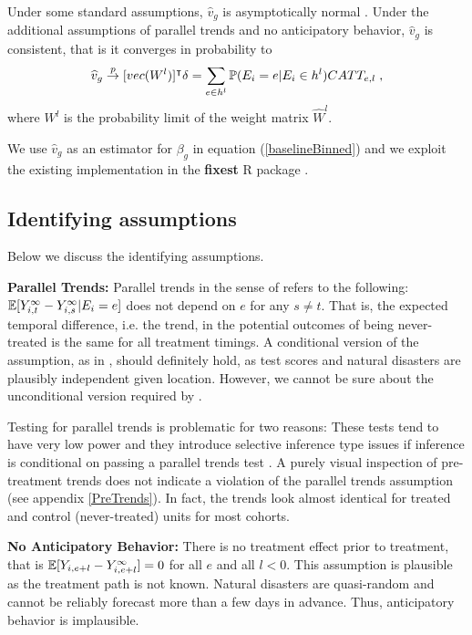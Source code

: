 Under some standard assumptions, $\widehat{v}_g$ is asymptotically normal \citep[for a proof and a detailed description of said assumptions see][Appendix C]{Sun_2021}. Under the additional assumptions of parallel trends and no anticipatory behavior, $\widehat{v}_g$ is consistent, that is it converges in probability to
\begin{align*}
	\widehat{v}_g \overset{p}{\to} [vec(W^{l})]^\intercal \delta = \sum_{e \in h^{l}} \mathbb{P}(E_i = e | E_i \in h^{l}) CATT_{e, l} \; ,
\end{align*}
where $W^{l}$ is the probability limit of the weight matrix $\widehat{W}^l$.

We use $\widehat{v}_g$ as an estimator for $\beta_{g}$ in equation (\ref{baselineBinned}) and we exploit the existing implementation in the \textbf{fixest} R package \citep{Berge_2018}.

\subsection{Identifying assumptions}

Below we discuss the identifying assumptions.

\textbf{Parallel Trends:} Parallel trends in the sense of \cite{Sun_2021} refers to the following: $\mathbb{E}[Y_{i, t}^{\infty} - Y_{i, s}^{\infty} | E_i = e]$ does not depend on $e$ for any $s \neq t$. That is, the expected temporal difference, i.e. the trend, in the potential outcomes of being never-treated is the same for all treatment timings. A conditional version of the assumption, as in \cite{Callaway_2021}, should definitely hold, as test scores and natural disasters are plausibly independent given location. However, we cannot be sure about the unconditional version required by \cite{Sun_2021}.

Testing for parallel trends is problematic for two reasons: These tests tend to have very low power and they introduce selective inference type issues if inference is conditional on passing a parallel trends test \citep{Rambachan_2019}. A purely visual inspection of pre-treatment trends does not indicate a violation of the parallel trends assumption (see appendix \ref{PreTrends}). In fact, the trends look almost identical for treated and control (never-treated) units for most cohorts.

\textbf{No Anticipatory Behavior:} There is no treatment effect prior to treatment, that is $\mathbb{E}[Y_{i, e+l} - Y_{i, e+l}^{\infty}] = 0$ for all $e$ and all $l < 0$. This assumption is plausible as the treatment path is not known. Natural disasters are quasi-random and cannot be reliably forecast more than a few days in advance. Thus, anticipatory behavior is implausible.

